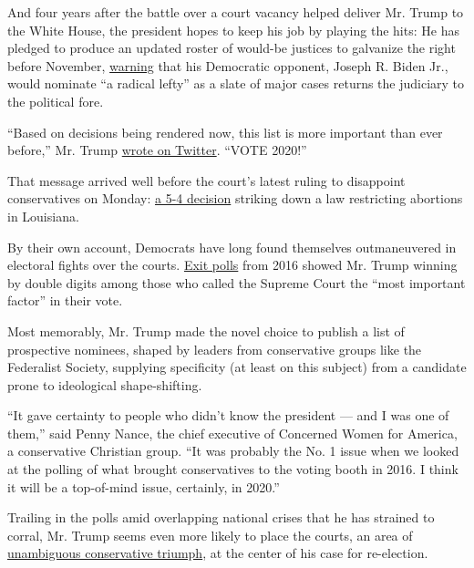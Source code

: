 And four years after the battle over a court vacancy helped deliver Mr.
Trump to the White House, the president hopes to keep his job by playing
the hits: He has pledged to produce an updated roster of would-be
justices to galvanize the right before November,
\href{https://www1.cbn.com/cbnnews/2020/june/exclusive-interview-with-president-trump-running-against-joe-biden-and-record-number-of-pro-life-judges}{warning}
that his Democratic opponent, Joseph R. Biden Jr., would nominate ``a
radical lefty'' as a slate of major cases returns the judiciary to the
political fore.

``Based on decisions being rendered now, this list is more important
than ever before,'' Mr. Trump
\href{https://twitter.com/realDonaldTrump/status/1273667868362768386}{wrote
on Twitter}. ``VOTE 2020!''

That message arrived well before the court's latest ruling to disappoint
conservatives on Monday:
\href{https://www.nytimes.com/2020/06/29/us/supreme-court-abortion-louisiana.html?action=click\&module=Alert\&pgtype=Homepage}{a
5-4 decision} striking down a law restricting abortions in Louisiana.

By their own account, Democrats have long found themselves outmaneuvered
in electoral fights over the courts.
\href{https://www.vox.com/2018/6/29/17511088/scotus-2016-election-poll-trump-republicans-kennedy-retire}{Exit
polls} from 2016 showed Mr. Trump winning by double digits among those
who called the Supreme Court the ``most important factor'' in their
vote.

Most memorably, Mr. Trump made the novel choice to publish a list of
prospective nominees, shaped by leaders from conservative groups like
the Federalist Society, supplying specificity (at least on this subject)
from a candidate prone to ideological shape-shifting.

``It gave certainty to people who didn't know the president --- and I
was one of them,'' said Penny Nance, the chief executive of Concerned
Women for America, a conservative Christian group. ``It was probably the
No. 1 issue when we looked at the polling of what brought conservatives
to the voting booth in 2016. I think it will be a top-of-mind issue,
certainly, in 2020.''

Trailing in the polls amid overlapping national crises that he has
strained to corral, Mr. Trump seems even more likely to place the
courts, an area of
\href{https://www.nytimes.com/2020/03/14/us/trump-appeals-court-judges.html}{unambiguous
conservative triumph}, at the center of his case for re-election.

